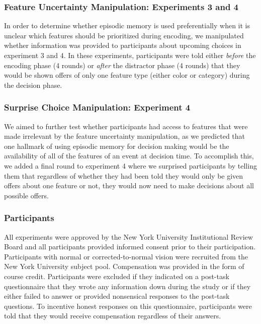 \documentclass[10pt,letterpaper]{article}
\begin{document}
\subsubsection{Feature Uncertainty Manipulation: Experiments 3 and 4}

In order to determine whether episodic memory is used preferentially when it is unclear which features should be prioritized during encoding, we manipulated whether information was provided to participants about upcoming choices in experiment 3 and 4. In these experiments, participants were told either \textit{before} the encoding phase (4 rounds) or \textit{after} the distractor phase (4 rounds) that they would be shown offers of only one feature type (either color or category) during the decision phase.

\subsubsection{Surprise Choice Manipulation: Experiment 4}

We aimed to further test whether participants had access to features that were made irrelevant by the feature uncertainty manipulation, as we predicted that one hallmark of using episodic memory for decision making would be the availability of all of the features of an event at decision time. To accomplish this, we added a final round to experiment 4 where we surprised participants by telling them that regardless of whether they had been told they would only be given offers about one feature or not, they would now need to make decisions about all possible offers.

\subsubsection{Participants}

All experiments were approved by the New York University Institutional Review Board and all participants provided informed consent prior to their participation. Participants with normal or corrected-to-normal vision were recruited from the New York University subject pool. Compensation was provided in the form of course credit. Participants were excluded if they indicated on a post-task questionnaire that they wrote any information down during the study or if they either failed to answer or provided nonsensical responses to the post-task questions. To incentive honest responses on this questionnaire, participants were told that they would receive compensation regardless of their answers.
\end{document}
